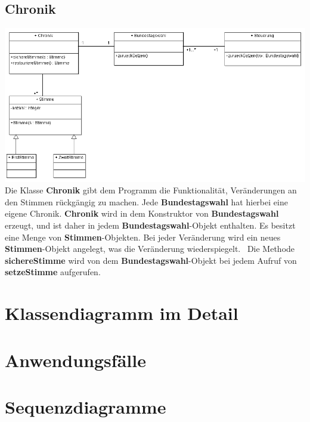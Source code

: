 \documentclass[10pt,a4paper]{article}
\begin{document}
\subsection{Chronik}
\includegraphics[scale=0.8] {Chronik_Ausschnitt.png}
\\
Die Klasse \textbf{Chronik} gibt dem Programm die Funktionalität, Veränderungen an den Stimmen rückgängig zu machen. Jede \textbf{Bundestagswahl} hat hierbei eine eigene Chronik. \textbf{Chronik} wird in dem Konstruktor von \textbf{Bundestagswahl} erzeugt, und ist daher in jedem \textbf{Bundestagswahl}-Objekt enthalten. Es besitzt eine Menge von \textbf{Stimmen}-Objekten. Bei jeder Veränderung wird ein neues \textbf{Stimmen}-Objekt angelegt, was die Veränderung wiederspiegelt.
\
Die Methode \textbf{sichereStimme} wird von dem \textbf{Bundestagswahl}-Objekt bei jedem Aufruf von \textbf{setzeStimme} aufgerufen.


\section{Klassendiagramm im Detail}

\section{Anwendungsfälle}



\section{Sequenzdiagramme}
\end{document}

